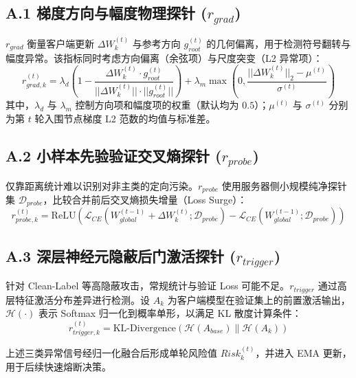 \documentclass[11pt, a4paper, UTF8, fontset=fandol]{ctexart}
\begin{document}
\subsection{A.1 梯度方向与幅度物理探针 ($r_{grad}$)}
$r_{grad}$ 衡量客户端更新 $\Delta W_k^{(t)}$ 与参考方向 $g_{root}^{(t)}$ 的几何偏离，用于检测符号翻转与幅度异常。该指标同时考虑方向偏离（余弦项）与尺度突变（L2 异常项）：
\begin{equation}
    r_{grad, k}^{(t)} = \lambda_{d} \left(1 - \frac{\Delta W_k^{(t)} \cdot g_{root}^{(t)}}{||\Delta W_k^{(t)}|| \cdot ||g_{root}^{(t)}||}\right) + \lambda_{m} \max\left(0, \frac{||\Delta W_k^{(t)}||_2 - \mu^{(t)}}{\sigma^{(t)}}\right)
\end{equation}
其中，$\lambda_d$ 与 $\lambda_m$ 控制方向项和幅度项的权重（默认均为 $0.5$）；$\mu^{(t)}$ 与 $\sigma^{(t)}$ 分别为第 $t$ 轮入围节点梯度 L2 范数的均值与标准差。

\subsection{A.2 小样本先验验证交叉熵探针 ($r_{probe}$)}
仅靠距离统计难以识别对非主类的定向污染。$r_{probe}$ 使用服务器侧小规模纯净探针集 $\mathcal{D}_{probe}$，比较合并前后交叉熵损失增量（Loss Surge）：
\begin{equation}
    r_{probe, k}^{(t)} = \text{ReLU}\left( \mathcal{L}_{CE}(W_{global}^{(t-1)} + \Delta W_k^{(t)}; \mathcal{D}_{probe}) - \mathcal{L}_{CE}(W_{global}^{(t-1)}; \mathcal{D}_{probe}) \right)
\end{equation}

\subsection{A.3 深层神经元隐蔽后门激活探针 ($r_{trigger}$)}
针对 Clean-Label 等高隐蔽攻击，常规统计与验证 Loss 可能不足。$r_{trigger}$ 通过高层特征激活分布差异进行检测。设 $A_k$ 为客户端模型在验证集上的前置激活输出，$\mathcal{H}(\cdot)$ 表示 Softmax 归一化到概率单形，以满足 KL 散度计算条件：
\begin{equation}
    r_{trigger, k}^{(t)} = \text{KL-Divergence}\left( \mathcal{H}(A_{base}) \| \mathcal{H}(A_k) \right)
\end{equation}

上述三类异常信号经归一化融合后形成单轮风险值 $Risk_{k}^{(t)}$，并进入 EMA 更新，用于后续快速熔断决策。
\end{document}
